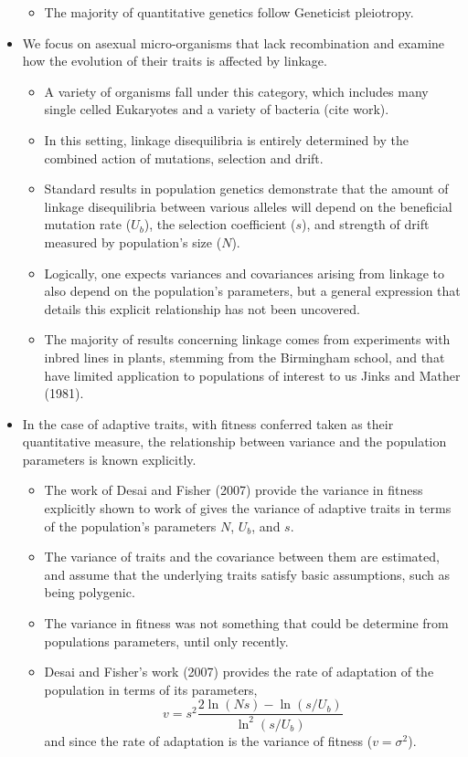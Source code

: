 \documentclass[12pt,one column]{article}
\begin{document}
\begin{itemize}
\begin{itemize}
	\item The majority of quantitative genetics follow Geneticist pleiotropy.
	\end{itemize}
\item We focus on asexual micro-organisms that lack recombination and examine how the evolution of their traits is affected by linkage.
	\begin{itemize}
	\item A variety of organisms fall under this category, which includes many single celled Eukaryotes and a variety of bacteria (cite work).
	\item In this setting, linkage disequilibria is entirely determined by the combined action of mutations, selection and drift. 
	\item Standard results in population genetics demonstrate that the amount of linkage disequilibria between various alleles will depend on the beneficial mutation rate ($U_b$), the selection coefficient ($s$), and strength of drift measured by population’s size ($N$). 
	\item Logically, one expects variances and covariances arising from linkage to also depend on the population’s parameters, but a general expression that details this explicit relationship has not been uncovered. 
	\item The majority of results concerning linkage comes from experiments with inbred lines in plants, stemming from the Birmingham school, and that have limited application to populations of interest to us Jinks and Mather (1981).
	\end{itemize}
\item In the case of adaptive traits, with fitness conferred taken as their quantitative measure, the relationship between variance and the population parameters is known explicitly. 
	\begin{itemize}
	\item The work of Desai and Fisher (2007) provide the variance in fitness explicitly shown to work of gives the variance of adaptive traits in terms of the population’s parameters $N$, $U_b$, and $s$. 
	\item The variance of traits and the covariance between them are estimated, and assume that the underlying traits satisfy basic assumptions, such as being polygenic. 
	\item The variance in fitness was not something that could be determine from populations parameters, until only recently. 
	\item Desai and Fisher’s work (2007) provides the rate of adaptation of the population in terms of its parameters, \[v =s^2  \frac{2 \ln(Ns)-\ln(s/U_b)}{\ln^2(s/U_b)}\] and since the rate of adaptation is the variance of fitness ($v=\sigma^2$).

\end{itemize}
\end{itemize}
\end{document}
